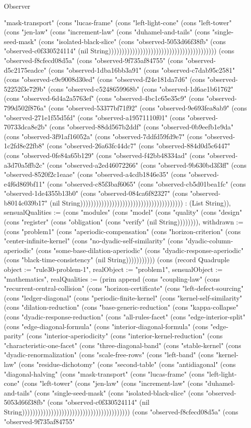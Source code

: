 \begin{lexlean}{Observer}
\begin{semanticmodule}
{"mask-transport" (cons "lucas-frame" (cons "left-light-cone" (cons "left-tower" (cons "jen-law" (cons "increment-law" (cons "duhamel-and-tails" (cons "single-seed-mask" (cons "isolated-black-slice" (cons "observed-5053d66f38fb" (cons "observed-c0f330524114" (nil String))))))))))))))))))))))))))))))))))))))))) (cons "observed-f8cfecd08d5a" (cons "observed-9f735af84755" (cons "observed-d5c2175eadce" (cons "observed-1dba16bb3a91" (cons "observed-c7dab95c2581" (cons "observed-c9e9008d30ed" (cons "observed-f24e181da7d6" (cons "observed-52252f3e729b" (cons "observed-c5248659968b" (cons "observed-1d6ae1b61762" (cons "observed-6d4a2a5763ef" (cons "observed-4bc1c65e35c9" (cons "observed-799d502f876a" (cons "observed-53377bf71f92" (cons "observed-9e693fea8ab9" (cons "observed-271e1f55d5fd" (cons "observed-a19571110f01" (cons "observed-70733dca8e2b" (cons "observed-88dd567b2ddf" (cons "observed-0b9eefb1e9da" (cons "observed-3f91af16052a" (cons "observed-7ddfd59fd9e7" (cons "observed-1c2fd8e22fb8" (cons "observed-26a63fc44dc7" (cons "observed-884d0d5c6447" (cons "observed-0fe84a65b129" (cons "observed-f42bb48334ad" (cons "observed-a3d70a5ffb2c" (cons "observed-a2ed46072266" (cons "observed-9b630bd3f3ff" (cons "observed-8520f2c1eaae" (cons "observed-a4cdb1846e35" (cons "observed-e4f6d869bf11" (cons "observed-c85f3baf6065" (cons "observed-cb5d01bea1fc" (cons "observed-1de4355b13b0" (cons "observed-084ca6f82327" (cons "observed-b8014c039b17" (nil String))))))))))))))))))))))))))))))))))))))) : (List String)), sensualQualities := (cons "modules" (cons "model" (cons "quality" (cons "design" (cons "register" (cons "obligation" (cons "verify" (nil String)))))))), withdrawn := (cons "problem1" (cons "aperiodic-compensation" (cons "horizon-criterion" (cons "center-infinite-kernel" (cons "no-dyadic-self-similarity" (cons "dyadic-column-aperiodic" (cons "some-base-dilation-aperiodic" (cons "dyadic-response-aperiodic" (cons "black-time-consistency" (nil String))))))))))}) (cons (record Quadruple {object := "rule30-problem-1", realObject := "problem1", sensualObject := "mathematics", realQualities := (prim append (cons "coupling-law" (cons "recurrent-central-collision" (cons "horizon-certificate" (cons "left-defect-sourcing" (cons "ledger-diagonal" (cons "periodic-finite-kernel" (cons "kernel-self-similarity" (cons "dilation-reduction" (cons "base-generic-reduction" (cons "kappa-collapse" (cons "dyadic-response-reduction" (cons "all-rules-facet" (cons "edge-interior-split" (cons "edge-diagonal-formula" (cons "interior-diagonal-formula" (cons "edge-parity" (cons "interior-aperiodicity" (cons "interior-kernel-reduction" (cons "characteristic-one-facet" (cons "three-diagonal-band" (cons "stable-kernel" (cons "dyadic-renormalization" (cons "scale-free-rows" (cons "left-band" (cons "kernel-law" (cons "residue-dichotomy" (cons "second-table" (cons "antidiagonal" (cons "diagonal-halving" (cons "mask-transport" (cons "lucas-frame" (cons "left-light-cone" (cons "left-tower" (cons "jen-law" (cons "increment-law" (cons "duhamel-and-tails" (cons "single-seed-mask" (cons "isolated-black-slice" (cons "observed-5053d66f38fb" (cons "observed-c0f330524114" (nil String))))))))))))))))))))))))))))))))))))))))) (cons "observed-f8cfecd08d5a" (cons "observed-9f735af84755" }
\end{semanticmodule}
\end{lexlean}
